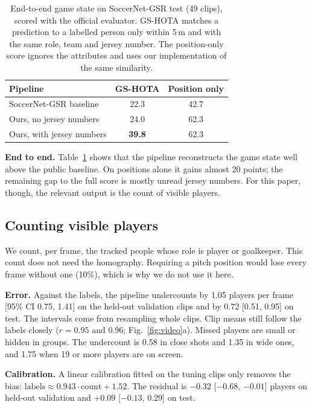 \documentclass[runningheads]{llncs}
\begin{document}
\begin{table}[t]
\centering
\caption{End-to-end game state on SoccerNet-GSR test (49 clips), scored with the official evaluator. GS-HOTA matches
a prediction to a labelled person only within 5\,m and with the same role, team and jersey number. The position-only
score ignores the attributes and uses our implementation of the same similarity.}
\label{tab:gsr}
\begin{tabular}{lcc}
\toprule
Pipeline & GS-HOTA & Position only \\
\midrule
SoccerNet-GSR baseline~\cite{somers2024gsr} & 22.3 & 42.7 \\
Ours, no jersey numbers & 24.0 & 62.3 \\
Ours, with jersey numbers & \textbf{39.8} & 62.3 \\
\bottomrule
\end{tabular}
\end{table}

\textbf{End to end.} Table~\ref{tab:gsr} shows that the pipeline reconstructs the game state well above the public
baseline. On positions alone it gains almost 20 points; the remaining gap to the full score is mostly unread jersey
numbers. For this paper, though, the relevant output is the count of visible players.

\subsection{Counting visible players}

We count, per frame, the tracked people whose role is player or goalkeeper. This count does not need the homography.
Requiring a pitch position would lose every frame without one (10\%), which is why we do not use it here.

\textbf{Error.} Against the labels, the pipeline undercounts by 1.05 players per frame [95\% CI 0.75, 1.41] on the
held-out validation clips and by 0.72 [0.51, 0.95] on test. The intervals come from resampling whole clips. Clip
means still follow the labels closely ($r = 0.95$ and $0.96$; Fig.~\ref{fig:video}a). Missed players are small or
hidden in groups. The undercount is 0.58 in close shots and 1.35 in wide ones, and 1.75 when 19 or more players are
on screen.

\textbf{Calibration.} A linear calibration fitted on the tuning clips only removes the bias:
$\text{labels} \approx 0.943 \cdot \text{count} + 1.52$. The residual is $-0.32$ [$-0.68$, $-0.01$] players on
held-out validation and $+0.09$ [$-0.13$, $0.29$] on test.
\end{document}

